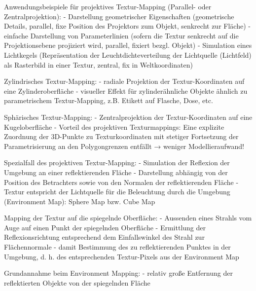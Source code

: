 \documentclass[10pt,landscape]{article}
\begin{document}
\begin{multicols}{3}
Anwendungsbeispiele für projektives Textur-Mapping (Parallel- oder Zentralprojektion):
- Darstellung geometrischer Eigenschaften (geometrische Details, parallel, fixe Position des Projektors zum Objekt, senkrecht zur Fläche)
- einfache Darstellung von Parameterlinien (sofern die Textur senkrecht auf die Projektionsebene projiziert wird, parallel, fixiert bezgl. Objekt)
- Simulation eines Lichtkegels (Repräsentation der Leuchtdichteverteilung der Lichtquelle (Lichtfeld) als Rasterbild in einer Textur, zentral, fix in Weltkoordinaten)

Zylindrisches Textur-Mapping:
- radiale Projektion der Textur-Koordinaten auf eine Zylinderoberfläche
- visueller Effekt für zylinderähnliche Objekte ähnlich zu parametrischem Textur-Mapping, z.B. Etikett auf Flasche, Dose, etc.

Sphärisches Textur-Mapping:
- Zentralprojektion der Textur-Koordinaten auf eine Kugeloberfläche
- Vorteil des projektiven Texturmappings: Eine explizite Zuordnung der 3D-Punkte zu Texturkoordinaten mit stetiger Fortsetzung der Parametrisierung an den Polygongrenzen entfällt → weniger Modellieraufwand!

Spezialfall des projektiven Textur-Mapping:
- Simulation der Reflexion der Umgebung an einer reflektierenden Fläche
- Darstellung abhängig von der Position des Betrachters sowie von den Normalen der reflektierenden Fläche
- Textur entspricht der Lichtquelle für die Beleuchtung durch die Umgebung (Environment Map): Sphere Map bzw. Cube Map

Mapping der Textur auf die spiegelnde Oberfläche:
- Aussenden eines Strahls vom Auge auf einen Punkt der spiegelnden Oberfläche
- Ermittlung der Reflexionsrichtung entsprechend dem Einfallswinkel des Strahl zur Flächennormale
- damit Bestimmung des zu reflektierenden Punktes in der Umgebung, d. h. des entsprechenden Textur-Pixels aus der Environment Map

Grundannahme beim Environment Mapping:
- relativ große Entfernung der reflektierten Objekte von der spiegelnden Fläche


\end{multicols}
\end{document}
